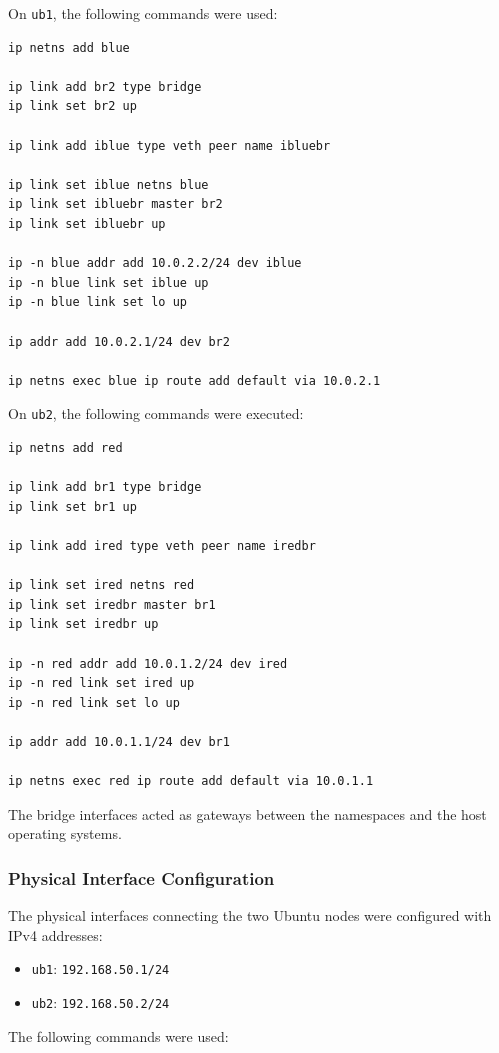 \documentclass[12pt]{article}
\begin{document}
On \texttt{ub1}, the following commands were used:

\begin{verbatim}
ip netns add blue

ip link add br2 type bridge
ip link set br2 up

ip link add iblue type veth peer name ibluebr

ip link set iblue netns blue
ip link set ibluebr master br2
ip link set ibluebr up

ip -n blue addr add 10.0.2.2/24 dev iblue
ip -n blue link set iblue up
ip -n blue link set lo up

ip addr add 10.0.2.1/24 dev br2

ip netns exec blue ip route add default via 10.0.2.1
\end{verbatim}

On \texttt{ub2}, the following commands were executed:

\begin{verbatim}
ip netns add red

ip link add br1 type bridge
ip link set br1 up

ip link add ired type veth peer name iredbr

ip link set ired netns red
ip link set iredbr master br1
ip link set iredbr up

ip -n red addr add 10.0.1.2/24 dev ired
ip -n red link set ired up
ip -n red link set lo up

ip addr add 10.0.1.1/24 dev br1

ip netns exec red ip route add default via 10.0.1.1
\end{verbatim}

The bridge interfaces acted as gateways between the namespaces and the host operating systems.

\subsubsection{Physical Interface Configuration}

The physical interfaces connecting the two Ubuntu nodes were configured with IPv4 addresses:

\begin{itemize}
    \item \texttt{ub1}: \texttt{192.168.50.1/24}
    \item \texttt{ub2}: \texttt{192.168.50.2/24}
\end{itemize}

The following commands were used:
\end{document}
